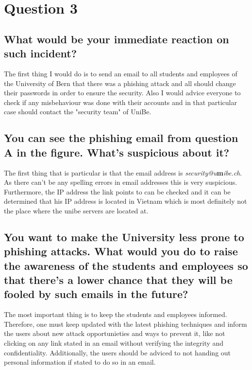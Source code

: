 \documentclass{report}
\begin{document}
	\section{Question 3}
	\startsection
		\renewcommand{\thesubsection}{\thesection.\Alph{subsection}}
		\subsection{What would be your immediate reaction on such incident?}
		\startsubsection
			The first thing I would do is to send an email to all students and employees of the University of Bern that there was a phishing attack and all should change their passwords in order to ensure the security. Also I would advice everyone to check if any misbehaviour was done with their accounts and in that particular case should contact the "security team" of UniBe.
		\closesection
		\subsection{You can see the phishing email from question A in the figure. What's suspicious about it?}
		\startsubsection
			The first thing that is particular is that the email address is \textit{security@u}\textbf{m}\textit{ibe.ch}. As there can't be any spelling errors in email addresses this is very suspicious. Furthermore, the IP address the link points to can be checked and it can be determined that his IP address is located in Vietnam which is most definitely not the place where the unibe servers are located at.
		\closesection
		\subsection{You want to make the University less prone to phishing attacks. What would you do to raise the awareness of the students and employees so that there's a lower chance that they will be fooled by such emails in the future?}
		\startsubsection
			The most important thing is to keep the students and employees informed. Therefore, one must keep updated with the latest phishing techniques and inform the users about new attack opportunieties and ways to prevent it, like not clicking on any link stated in an email without verifying the integrity and confidentiality. Additionally, the users should be adviced to not handing out personal information if stated to do so in an email.
		\closesection
	\closesection
\end{document}
